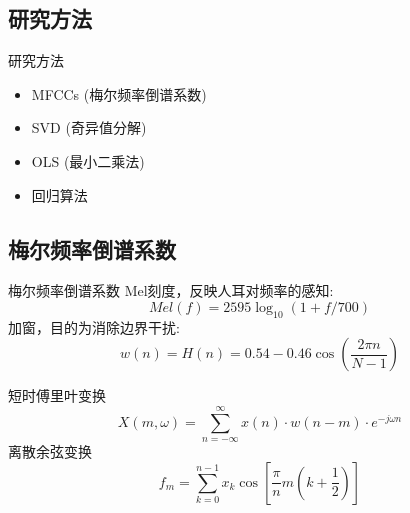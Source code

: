 \documentclass[10pt]{beamer}
\begin{document}
\subsection{研究方法}
\begin{frame}{研究方法}
    \begin{itemize}
        \item MFCCs (梅尔频率倒谱系数)
        \item SVD (奇异值分解)
        \item OLS (最小二乘法)
        \item 回归算法
    \end{itemize}
\end{frame}
\subsection{梅尔频率倒谱系数}
\begin{frame}{梅尔频率倒谱系数}
    Mel刻度，反映人耳对频率的感知:
    \begin{equation}
        Mel(f) = 2595 \log_{10}(1+f/700)
    \end{equation}
    加窗，目的为消除边界干扰:
    \begin{equation}
        w(n) = H(n) = 0.54 - 0.46 \cos \left( \frac{2\pi n}{N-1} \right)
    \end{equation}
\end{frame}
\begin{frame}
    短时傅里叶变换
    \begin{equation}
        X(m, \omega) = \sum_{n=-\infty}^{\infty} x(n) \cdot w(n-m) \cdot e^{-j\omega n}
    \end{equation}
    离散余弦变换
    \begin{equation}
        f_m = \sum_{k=0}^{n-1} x_k \cos [\frac{\pi}{n}m(k+\frac{1}{2})]
    \end{equation}
\end{frame}
\end{document}
